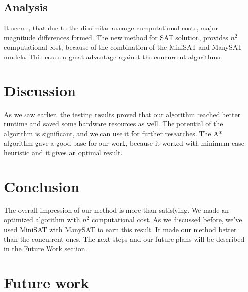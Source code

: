 \documentclass{article}
\begin{document}
\subsection{Analysis}
It seems, that due to the dissimilar average computational costs, major magnitude differences formed. The new method for SAT solution, provides $n^{2}$ computational cost, because of the combination of the MiniSAT and ManySAT models. This cause a great advantage against the concurrent algorithms.

\section{Discussion}
\label{sec:discussion}

As we saw earlier, the testing results proved that our algorithm reached better runtime and saved some hardware resources as well. The potential of the algorithm is significant, and we can use it for further researches. The A* algorithm gave a good base for our work, because it worked with minimum case heuristic and it gives an optimal result.

\section{Conclusion}
\label{sec:conclusion}

The overall impression of our method is more than satisfying. We made an optimized algorithm with $n^2$ computational cost. As we discussed before, we've used MiniSAT with ManySAT to earn this result. It made our method better than the concurrent ones. The next steps and our future plans will be described in the Future Work section.

\section{Future work}
\label{sec:future}
\end{document}
